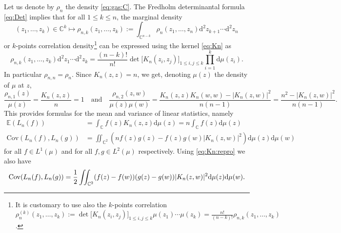 \documentclass[10pt,reqno]{amsart}
\numberwithin{equation}{section}
\numberwithin{figure}{section}
\theoremstyle{plain}
\newcommand{\<}{\langle}
\renewcommand{\>}{\rangle}
\begin{document}
Let us denote by $\rho_n$ the density \eqref{eq:gas:C}. The Fredholm determinantal formula \eqref{eq:Det} implies that for all $1\leq k\leq n$, the marginal density
\begin{equation}
   (z_1,\ldots,z_k)\in\mathbb{C}^k
   \mapsto\rho_{n,k}(z_1,\ldots,z_k):=\int_{\mathbb{C}^{n-k}}\rho_n(z_1,\ldots,z_n)\mathrm{d}^2z_{k+1}\cdots\mathrm{d}^2z_n
 \end{equation}
 or $k$-points correlation density\footnote{It is customary to use also the $k$-points correlation
$\rho_n^{(k)}(z_1,\ldots,z_k):=\det\bigl[K_n(z_i,z_j)\bigr]_{1\leq i,j\leq
  k}\mu(z_1)\cdots\mu(z_k)=\frac{n!}{(n-k)!}\rho_{n,k}(z_1,\ldots,z_k)$.} can be expressed using the kernel \eqref{eq:Kn} as
\begin{equation}
  \rho_{n,k}(z_1,\ldots,z_k)
  \mathrm{d}^2z_1\cdots\mathrm{d}^2z_k
  =\frac{(n-k)!}{n!}\det\bigl[K_n(z_i,z_j)\bigr]_{1\leq i,j\leq k}\prod_{i=1}^k\mathrm{d}\mu(z_i).
\end{equation}
In particular $\rho_{n,n}=\rho_n$. Since $K_n(z,z)=n$, we get, denoting $\mu(z)$ the density of $\mu$ at $z$,
\begin{equation}\label{eq:rho}
\frac{\rho_{n,1}(z)}{\mu(z)}=\frac{K_n(z,z)}{n}=1
\quad\text{and}\quad
\frac{\rho_{n,2}(z,w)}{\mu(z)\mu(w)}=\frac{K_n(z,z)K_n(w,w)-|K_n(z,w)|^2}{n(n-1)}
=\frac{n^2-|K_n(z,w)|^2}{n(n-1)}.
\end{equation}
This provides formulas for the mean and variance of linear statistics, namely 
\begin{align}
  \mathbb{E}(L_n(f))
  &=\int_{\mathbb{C}}f(z)K_n(z,z)\mathrm{d}\mu(z)=n\int_{\mathbb{C}}f(z)\mathrm{d}\mu(z)\label{eq:ELn}\\
   \mathrm{Cov}(L_n(f),L_n(g))
  &=\iint_{\mathbb{C}^2} (nf(z)g(z)-f(z)g(w)|K_n(z,w)|^2)\mathrm{d}\mu(z)\mathrm{d}\mu(w)\label{eq:CovLnLn2}
\end{align}
for all $f\in L^1(\mu)$ and for all $f,g\in L^2(\mu)$ respectively.
Using \eqref{eq:Kn:repro} we also have
\begin{equation}
   \mathrm{Cov}(L_n(f),L_n(g))
  =\frac{1}{2}\iint_{\mathbb{C}^2} (f(z)-f(w))(g(z)-g(w))|K_n(z,w)|^2\mathrm{d}\mu(z)\mathrm{d}\mu(w).\label{eq:CovLnLn}\\
\end{equation}


%
%
%
%
%
%
%
%
%
%
 
 
%
%

%

%
%
%
%
%
%
\end{document}

